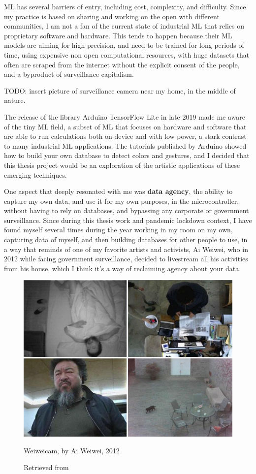 \acrshort{ML} has several barriers of entry, including cost, complexity, and difficulty. Since my practice is based on sharing and working on the open with different communities, I am not a fan of the current state of industrial \acrshort{ML} that relies on proprietary software and hardware. This tends to happen because their ML models are aiming for high precision, and need to be trained for long periods of time, using expensive non open computational resources, with huge datasets that often are scraped from the internet without the explicit consent of the people, and a byproduct of surveillance capitalism.

TODO: insert picture of surveillance camera near my home, in the middle of nature.

The release of the library Arduino TensorFlow Lite in late 2019 made me aware of the tiny \acrshort{ML} field, a subset of \acrshort{ML} that focuses on hardware and software that are able to run calculations both on-device and with low power, a stark contrast to many industrial \acrshort{ML} applications. The tutorials published by Arduino showed how to build your own database to detect colors and gestures, and I decided that this thesis project would be an exploration of the artistic applications of these emerging techniques.

One aspect that deeply resonated with me was \textbf{data agency}, the ability to capture my own data, and use it for my own purposes, in the microcontroller, without having to rely on databases, and bypassing any corporate or government surveillance. Since during this thesis work and pandemic lockdown context, I have found myself several times during the year working in my room on my own, capturing data of myself, and then building databases for other people to use, in a way that reminds of one of my favorite artists and activists, Ai Weiwei, who in 2012 while facing government surveillance, decided to livestream all his activities from his house, which I think it's a way of reclaiming agency about your data. 

\begin{figure}[ht]
  \centering
  \includegraphics[width=0.75\linewidth,height=0.25\textheight,keepaspectratio]{images/weiweicam.jpg}
  \caption{Weiweicam, by Ai Weiwei, 2012}
  \caption*{Retrieved from \cite{website-forbes-ai-weiwei-cam}}
  \label{fig:weiweicam}
\end{figure}

